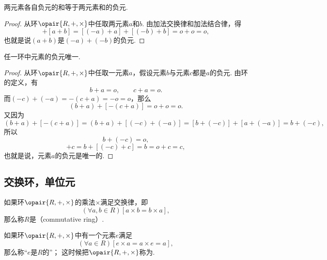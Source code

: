 \begin{property}
两元素各自负元的和等于两元素和的负元.
\begin{proof}
从环\(\opair{R,+,\times}\)中任取两元素\(a\)和\(b\).
由加法交换律和加法结合律，得\begin{equation*}
	[(-a) + (-b)] + [a + b]
	= [(-a) + a] + [(-b) + b]
	= o + o = o,
\end{equation*}
也就是说\((a+b)\)是\((-a) + (-b)\)的负元.
\end{proof}
\end{property}

\begin{property}
任一环中元素的负元唯一.
\begin{proof}
从环\(\opair{R,+,\times}\)中任取一元素\(a\)，假设元素\(b\)与元素\(c\)都是\(a\)的负元.
由环的定义，有\begin{equation*}
	b + a = o, \qquad
	c + a = o.
\end{equation*}
而\((-c) + (-a) = -(c + a) = -o = o\)，那么\begin{equation*}
	(b + a) + [-(c + a)]
	= o + o = o.
\end{equation*}又因为\begin{equation*}
	(b + a) + [-(c + a)]
	= (b + a) + [(-c) + (-a)]
	= [b + (-c)] + [a + (-a)]
	= b + (-c),
\end{equation*}所以\begin{equation*}
	b + (-c) = o,
\end{equation*}\begin{equation*}
	[b + (-c)] + c = b + [(-c) + c] = b = o + c = c,
\end{equation*}
也就是说，元素\(a\)的负元是唯一的.
\end{proof}
\end{property}

\subsection{交换环，单位元}
\begin{definition}
如果环\(\opair{R,+,\times}\)的乘法\(\times\)满足交换律，即\begin{equation*}
	(\forall a,b \in R)[a \times b = b \times a],
\end{equation*}
那么称\(R\)是（commutative ring）.
\end{definition}

\begin{definition}
如果环\(\opair{R,+,\times}\)中有一个元素\(e\)满足\begin{equation*}
	(\forall a \in R)[e \times a = a \times e = a],
\end{equation*}
那么称“\(e\)是\(R\)的”；
这时候把\(\opair{R,+,\times}\)称为.
\end{definition}

